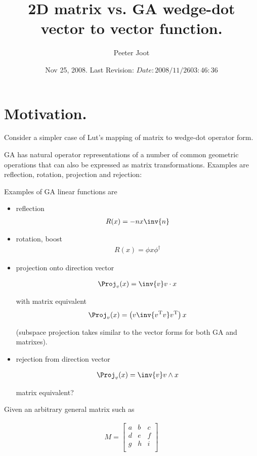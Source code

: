 \documentclass{article}
\title{ 2D matrix vs. GA wedge-dot vector to vector function. }
\author{Peeter Joot}
\date{ Nov 25, 2008.  Last Revision: $Date: 2008/11/26 03:46:36 $ }
\newcommand{\T}[0]{{\text{T}}}
\begin{document}
\maketitle{}

\section{ Motivation. }

Consider a simpler case of Lut's mapping of matrix to wedge-dot operator form.

GA has natural operator representations of a number of common geometric
operations that can also be expressed as matrix transformations.  Examples
are reflection, rotation, projection and rejection:


Examples of GA linear functions are

\begin{itemize}
\item reflection
\begin{align*}
R(x) = -n x \inv{n}
\end{align*}

\item rotation, boost
\begin{align*}
R(x) = \phi x \phi^\dagger
\end{align*}

\item projection onto direction vector

\begin{align*}
\Proj_v(x) = \inv{v} v \cdot x
\end{align*}

with matrix equivalent
\begin{align*}
\Proj_v(x) = \left(v \inv{v^\T v} v^\T \right) x
\end{align*}

(subspace projection takes similar to the vector forms for both GA and matrixes).

\item rejection from direction vector

\begin{align*}
\Proj_v(x) = \inv{v} v \wedge x
\end{align*}

matrix equivalent?

\end{itemize}

Given an arbitrary general matrix such as 

\begin{align*}
M = 
\begin{bmatrix}
a & b & c \\
d & e & f \\
g & h & i \\
\end{bmatrix}
\end{align*}
\end{document}
